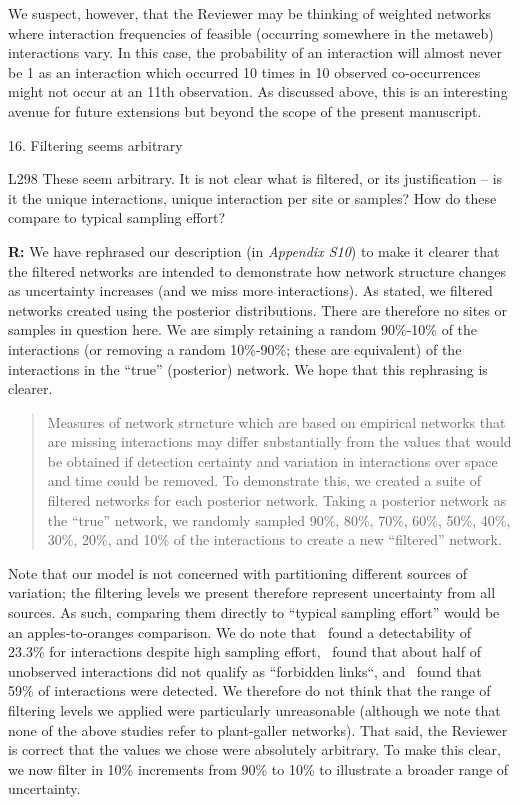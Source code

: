 \documentclass[12pt]{letter}
\newenvironment{refquote}{\bigskip \begin{it}}{\end{it}\smallskip}
\begin{document}
		We suspect, however, that the Reviewer may be thinking of weighted networks where interaction frequencies of feasible (occurring somewhere in the metaweb) interactions vary. In this case, the probability of an interaction will almost never be 1 as an interaction which occurred 10 times in 10 observed co-occurrences might not occur at an 11th observation. As discussed above, this is an interesting avenue for future extensions but beyond the scope of the present manuscript.


	16. Filtering seems arbitrary 

		\begin{refquote}
		L298 These seem arbitrary. It is not clear what is filtered, or its justification – is it the unique interactions, unique interaction per site or samples? How do these compare to typical sampling effort?
		\end{refquote}


		\textbf{R:} We have rephrased our description (in \emph{Appendix S10}) to make it clearer that the filtered networks are intended to demonstrate how network structure changes as uncertainty increases (and we miss more interactions). As stated, we filtered networks created using the posterior distributions. There are therefore no sites or samples in question here. We are simply retaining a random 90\%-10\% of the interactions (or removing a random 10\%-90\%; these are equivalent) of the interactions in the ``true'' (posterior) network. We hope that this rephrasing is clearer. 


			\begin{quotation}
				Measures of network structure which are based on empirical networks that are missing interactions may differ substantially from the values that would be obtained if detection certainty and variation in interactions over space and time could be removed. To demonstrate this, we created a suite of filtered networks for each posterior network. Taking a posterior network as the ``true'' network, we randomly sampled 90\%, 80\%, 70\%, 60\%, 50\%, 40\%, 30\%, 20\%, and 10\% of the interactions to create a new ``filtered'' network.
			\end{quotation}


		Note that our model is not concerned with partitioning different sources of variation; the filtering levels we present therefore represent uncertainty from all sources. As such, comparing them directly to ``typical sampling effort'' would be an apples-to-oranges comparison. We do note that~\citet{Weinstein2017a} found a detectability of 23.3\% for interactions despite high sampling effort,~\citet{Jordano2016} found that about half of unobserved interactions did not qualify as ``forbidden links``, and~\citet{Bartomeus2013} found that 59\% of interactions were detected. We therefore do not think that the range of filtering levels we applied were particularly unreasonable (although we note that none of the above studies refer to plant-galler networks). That said, the Reviewer is correct that the values we chose were absolutely arbitrary. To make this clear, we now filter in 10\% increments from 90\% to 10\% to illustrate a broader range of uncertainty.
\end{document}
